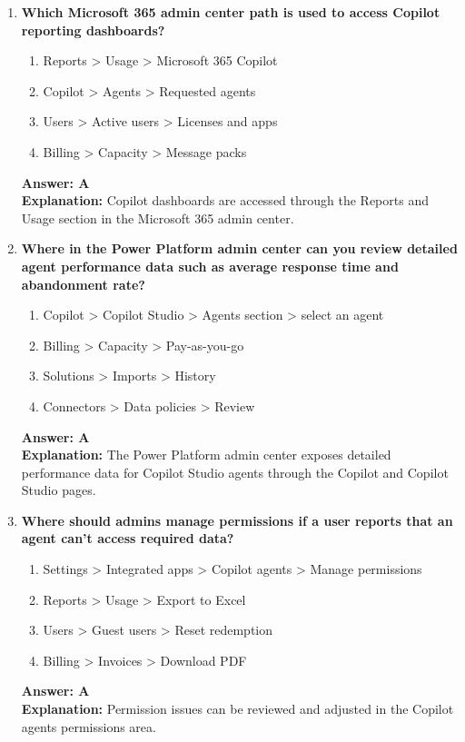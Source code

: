 \documentclass[10pt]{article}
\begin{document}
\begin{enumerate}[leftmargin=*]
\item \textbf{Which Microsoft 365 admin center path is used to access Copilot reporting dashboards?}
\begin{enumerate}[label=\Alph*.]
  \item Reports > Usage > Microsoft 365 Copilot
  \item Copilot > Agents > Requested agents
  \item Users > Active users > Licenses and apps
  \item Billing > Capacity > Message packs
\end{enumerate}
\textbf{Answer: A}\\
\textbf{Explanation:} Copilot dashboards are accessed through the Reports and Usage section in the Microsoft 365 admin center.

\item \textbf{Where in the Power Platform admin center can you review detailed agent performance data such as average response time and abandonment rate?}
\begin{enumerate}[label=\Alph*.]
  \item Copilot > Copilot Studio > Agents section > select an agent
  \item Billing > Capacity > Pay-as-you-go
  \item Solutions > Imports > History
  \item Connectors > Data policies > Review
\end{enumerate}
\textbf{Answer: A}\\
\textbf{Explanation:} The Power Platform admin center exposes detailed performance data for Copilot Studio agents through the Copilot and Copilot Studio pages.

\item \textbf{Where should admins manage permissions if a user reports that an agent can't access required data?}
\begin{enumerate}[label=\Alph*.]
  \item Settings > Integrated apps > Copilot agents > Manage permissions
  \item Reports > Usage > Export to Excel
  \item Users > Guest users > Reset redemption
  \item Billing > Invoices > Download PDF
\end{enumerate}
\textbf{Answer: A}\\
\textbf{Explanation:} Permission issues can be reviewed and adjusted in the Copilot agents permissions area.


\end{enumerate}
\end{document}
